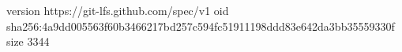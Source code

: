 version https://git-lfs.github.com/spec/v1
oid sha256:4a9dd005563f60b3466217bd257c594fc51911198ddd83e642da3bb35559330f
size 3344
